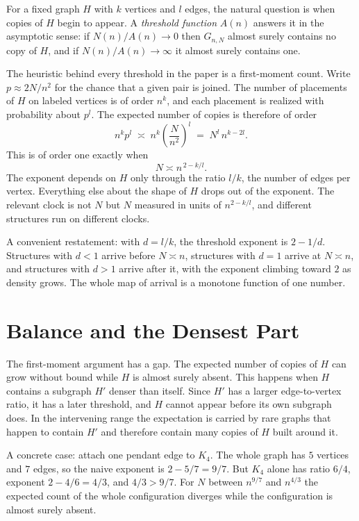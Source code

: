 \documentclass[11pt]{article}
\begin{document}
For a fixed graph $H$ with $k$ vertices and $l$ edges, the natural question is when copies of $H$ begin to appear. A \emph{threshold function} $A(n)$ answers it in the asymptotic sense: if $N(n)/A(n)\to 0$ then $G_{n,N}$ almost surely contains no copy of $H$, and if $N(n)/A(n)\to\infty$ it almost surely contains one.

The heuristic behind every threshold in the paper is a first-moment count. Write $p \approx 2N/n^2$ for the chance that a given pair is joined. The number of placements of $H$ on labeled vertices is of order $n^k$, and each placement is realized with probability about $p^l$. The expected number of copies is therefore of order
\[
n^k p^l \;\asymp\; n^k \left(\frac{N}{n^2}\right)^{l} \;=\; N^l\, n^{k-2l}.
\]
This is of order one exactly when
\[
N \asymp n^{\,2-k/l}.
\]
The exponent depends on $H$ only through the ratio $l/k$, the number of edges per vertex. Everything else about the shape of $H$ drops out of the exponent. The relevant clock is not $N$ but $N$ measured in units of $n^{2-k/l}$, and different structures run on different clocks.

A convenient restatement: with $d = l/k$, the threshold exponent is $2 - 1/d$. Structures with $d<1$ arrive before $N \asymp n$, structures with $d=1$ arrive at $N\asymp n$, and structures with $d>1$ arrive after it, with the exponent climbing toward $2$ as density grows. The whole map of arrival is a monotone function of one number.

\section{Balance and the Densest Part}

The first-moment argument has a gap. The expected number of copies of $H$ can grow without bound while $H$ is almost surely absent. This happens when $H$ contains a subgraph $H'$ denser than itself. Since $H'$ has a larger edge-to-vertex ratio, it has a later threshold, and $H$ cannot appear before its own subgraph does. In the intervening range the expectation is carried by rare graphs that happen to contain $H'$ and therefore contain many copies of $H$ built around it.

A concrete case: attach one pendant edge to $K_4$. The whole graph has $5$ vertices and $7$ edges, so the naive exponent is $2-5/7 = 9/7$. But $K_4$ alone has ratio $6/4$, exponent $2 - 4/6 = 4/3$, and $4/3 > 9/7$. For $N$ between $n^{9/7}$ and $n^{4/3}$ the expected count of the whole configuration diverges while the configuration is almost surely absent.
\end{document}
